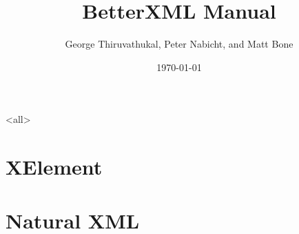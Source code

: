 \usepackage{verbatim}
\usepackage{graphicx}
\usepackage{hyperref}
\hypersetup{
  colorlinks=true,
  urlcolor=blue,
  linkcolor=black
}

\title{BetterXML Manual}
\author{George Thiruvathukal, Peter Nabicht, and Matt Bone}
\date{\today}



\tableofcontents
{}
\mode<all>{}

\section{XElement}
\section{Natural XML}




